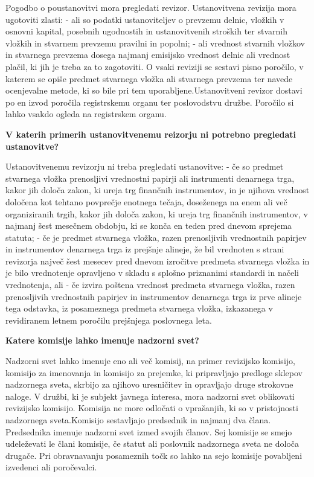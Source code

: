 \documentclass[a4paper,12pt,openright]{book}
\begin{document}
Pogodbo o poustanovitvi mora pregledati revizor. Ustanovitvena revizija mora ugotoviti zlasti:
- ali so podatki ustanoviteljev o prevzemu delnic, vložkih v osnovni kapital, posebnih ugodnostih in ustanovitvenih stroških ter stvarnih vložkih in stvarnem prevzemu pravilni in popolni;
- ali vrednost stvarnih vložkov in stvarnega prevzema dosega najmanj emisijsko vrednost delnic ali vrednost plačil, ki jih je treba za to zagotoviti.
O vsaki reviziji se sestavi pisno poročilo, v katerem se opiše predmet stvarnega vložka ali stvarnega prevzema ter navede ocenjevalne metode, ki so bile pri tem uporabljene.Ustanovitveni revizor dostavi po en izvod poročila registrskemu organu ter poslovodstvu družbe. Poročilo si lahko vsakdo ogleda na registrskem organu.

\textbf{V katerih primerih ustanovitvenemu reizorju ni potrebno pregledati ustanovitve?}

Ustanovitvenemu revizorju ni treba pregledati ustanovitve:
- če so predmet stvarnega vložka prenosljivi vrednostni papirji ali instrumenti denarnega trga, kakor jih določa zakon, ki ureja trg finančnih instrumentov, in je njihova vrednost določena kot tehtano povprečje enotnega tečaja, doseženega na enem ali več organiziranih trgih, kakor jih določa zakon, ki ureja trg finančnih instrumentov, v najmanj šest mesečnem obdobju, ki se konča en teden pred dnevom sprejema statuta;
- če je predmet stvarnega vložka, razen prenosljivih vrednostnih papirjev in instrumentov denarnega trga iz prejšnje alineje, že bil vrednoten s strani revizorja največ šest mesecev pred dnevom izročitve predmeta stvarnega vložka in je bilo vrednotenje opravljeno v skladu s splošno priznanimi standardi in načeli vrednotenja, ali
- če izvira poštena vrednost predmeta stvarnega vložka, razen prenosljivih vrednostnih papirjev in instrumentov denarnega trga iz prve alineje tega odstavka, iz posameznega predmeta stvarnega vložka, izkazanega v revidiranem letnem poročilu prejšnjega poslovnega leta.

\textbf{Katere komisije lahko imenuje nadzorni svet?}

Nadzorni svet lahko imenuje eno ali več komisij, na primer revizijsko komisijo, komisijo za imenovanja in komisijo za prejemke, ki pripravljajo predloge sklepov nadzornega sveta, skrbijo za njihovo uresničitev in opravljajo druge strokovne naloge. V družbi, ki je subjekt javnega interesa, mora nadzorni svet oblikovati revizijsko komisijo. Komisija ne more odločati o vprašanjih, ki so v pristojnosti nadzornega sveta.Komisijo sestavljajo predsednik in najmanj dva člana. Predsednika imenuje nadzorni svet izmed svojih članov. Sej komisije se smejo udeleževati le člani komisije, če statut ali poslovnik nadzornega sveta ne določa drugače. Pri obravnavanju posameznih točk so lahko na sejo komisije povabljeni izvedenci ali poročevalci.
\end{document}
